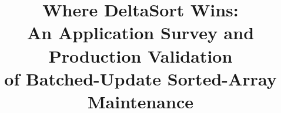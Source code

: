 \documentclass[10pt,conference]{IEEEtran}
\title{Where DeltaSort Wins:\\
An Application Survey and Production Validation\\
of Batched-Update Sorted-Array Maintenance}
\author{\IEEEauthorblockN{Shubham Dwivedi}
\IEEEauthorblockA{Independent Researcher\\
\texttt{shubd3@gmail.com}}}
\begin{document}
\maketitle

\begin{abstract}

\end{abstract}











\end{document}
